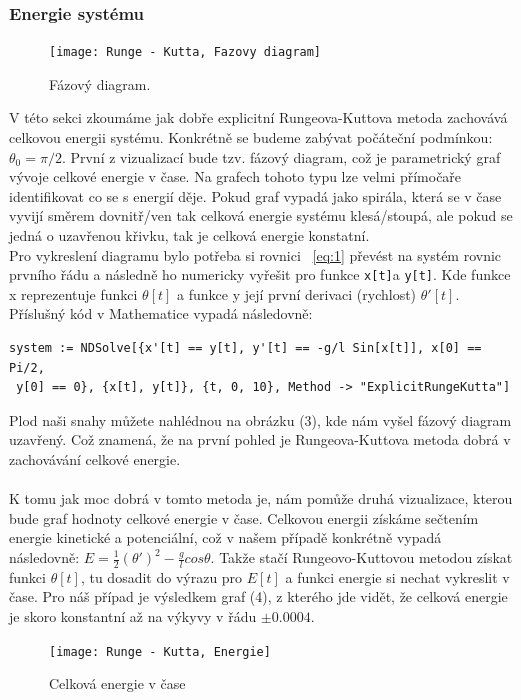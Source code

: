 \documentclass[reqno, a4paper]{amsart}
\begin{document}
\subsubsection{Energie systému}
\label{sec:sys-energy}
\begin{figure}
\texttt{[image: Runge - Kutta, Fazovy diagram]}
\caption*{Fázový diagram.}
\end{figure}
V této sekci zkoumáme jak dobře explicitní Rungeova-Kuttova metoda zachovává celkovou energii systému. Konkrétně se budeme zabývat počáteční podmínkou: $\theta_{0} = \pi /2$. První z vizualizací bude tzv. fázový diagram, což je parametrický graf vývoje celkové energie v čase. Na grafech tohoto typu lze velmi přímočaře identifikovat co se s energií děje. Pokud graf vypadá jako spirála, která se v čase vyvijí směrem dovnitř/ven tak celková energie systému klesá/stoupá, ale pokud se jedná o uzavřenou křivku, tak je celková energie konstatní.\\
Pro vykreslení diagramu bylo potřeba si rovnici ~\eqref{eq:1} převést na systém rovnic prvního řádu a následně ho numericky vyřešit pro funkce \verb|x[t]|a \verb|y[t]|. Kde funkce x reprezentuje funkci $\theta [t]$ a funkce y její první derivaci (rychlost) $\theta' [t]$. Příslušný kód v Mathematice vypadá následovně:
\begin{verbatim}
system := NDSolve[{x'[t] == y[t], y'[t] == -g/l Sin[x[t]], x[0] == Pi/2,
 y[0] == 0}, {x[t], y[t]}, {t, 0, 10}, Method -> "ExplicitRungeKutta"]
\end{verbatim}
Plod naši snahy můžete nahlédnou na obrázku (3), kde nám vyšel fázový diagram uzavřený. Což znamená, že na první pohled je Rungeova-Kuttova metoda dobrá v zachovávání celkové energie.\\ \\
K tomu jak moc dobrá v tomto metoda je, nám pomůže druhá vizualizace, kterou bude graf hodnoty celkové energie v čase. Celkovou energii získáme sečtením energie kinetické a potenciální, což v našem případě konkrétně vypadá následovně: $E = \frac{1}{2} (\theta')^2 - \frac{g}{l} cos \theta$. Takže stačí Rungeovo-Kuttovou metodou získat funkci $\theta[t]$, tu dosadit do výrazu pro $E[t]$ a funkci energie si nechat vykreslit v čase. Pro náš případ je výsledkem graf (4), z kterého jde vidět, že celková energie je skoro konstantní až na výkyvy v řádu $\pm 0.0004$.

\begin{figure}[h]
\begin{flushleft}
\texttt{[image: Runge - Kutta, Energie]}
\caption*{Celková energie v čase}
\end{flushleft}
\end{figure}


\end{document}
